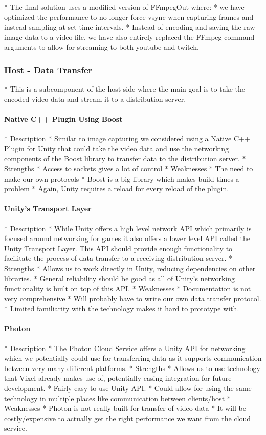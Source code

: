     * The final solution uses a modified version of FFmpegOut where: 
        * we have optimized the performance to no longer force vsync when capturing frames and instead sampling at set time intervals. 
        * Instead of encoding and saving the raw image data to a video file, we have also entirely replaced the FFmpeg command arguments to allow for streaming to both youtube and twitch. 
    

\subsubsection{Host - Data Transfer} %
    * This is a subcomponent of the host side where the main goal is to take the encoded video data and stream it to a distribution server.
    

\paragraph{Native C++ Plugin Using Boost}
    * Description
        * Similar to image capturing we considered using a Native C++ Plugin for Unity that could take the video data and use the networking components of the Boost library to transfer data to the distribution server.  
    * Strengths
        * Access to sockets gives a lot of control
    * Weaknesses
        * The need to make our own protocols
        * Boost is a big library which makes build times a problem
        * Again, Unity requires a reload for every reload of the plugin. 
\paragraph{Unity's Transport Layer}
    * Description
        * While Unity offers a high level network API which primarily is focused around networking for games it also offers a lower level API called the Unity Transport Layer. This API should provide enough functionality to facilitate the process of data transfer to a receiving distribution server.
    * Strengths
        * Allows us to work directly in Unity, reducing dependencies on other libraries. 
        * General reliability should be good as all of Unity's networking functionality is built on top of this API.
    * Weaknesses
        * Documentation is not very comprehensive
        * Will probably have to write our own data transfer protocol. 
        * Limited familiarity with the technology makes it hard to prototype with. 
\paragraph{Photon}
    * Description
        * The Photon Cloud Service offers a Unity API for networking which we potentially could use for transferring data as it supports communication between very many different platforms. 
    * Strengths
        * Allows us to use technology that Vixel already makes use of, potentially easing integration for future development. 
        * Fairly easy to use Unity API.
        * Could allow for using the same technology in multiple places like communication between clients/host
    * Weaknesses
        * Photon is not really built for transfer of video data
        * It will be costly/expensive to actually get the right performance we want from the cloud service.
